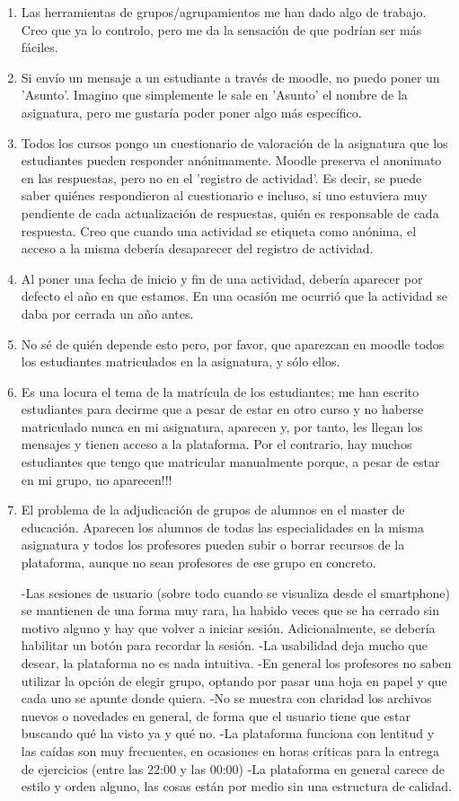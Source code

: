 \begin{enumerate}
\item Las herramientas de grupos/agrupamientos me han dado algo de trabajo. Creo que ya lo controlo, pero me da la sensación de que podrían ser más fáciles.
\item Si envío un mensaje a un estudiante a través de moodle, no puedo poner un 'Asunto'. Imagino que simplemente le sale en 'Asunto' el nombre de la asignatura, pero me gustaría poder poner algo más específico.
\item Todos los cursos pongo un cuestionario de valoración de la asignatura que los estudiantes pueden responder anónimamente. Moodle preserva el anonimato en las respuestas, pero no en el 'registro de actividad'. Es decir, se puede saber quiénes respondieron al cuestionario e incluso, si uno estuviera muy pendiente de cada actualización de respuestas, quién es responsable de cada respuesta. Creo que cuando una actividad se etiqueta como anónima, el acceso a la misma debería desaparecer del registro de actividad.
\item Al poner una fecha de inicio y fin de una actividad, debería aparecer por defecto el año en que estamos. En una ocasión me ocurrió que la actividad se daba por cerrada un año antes.
\item No sé de quién depende esto pero, por favor, que aparezcan en moodle todos los estudiantes matriculados en la asignatura, y sólo ellos.

\item Es una locura el tema de la matrícula de los estudiantes; me han escrito estudiantes para decirme que a pesar de estar en otro curso y no haberse matriculado nunca en mi asignatura, aparecen y, por tanto, les llegan los mensajes y tienen acceso a la plataforma. Por el contrario, hay muchos estudiantes que tengo que matricular manualmente porque, a pesar de estar en mi grupo, no aparecen!!! 

\item El problema de la adjudicación de grupos de alumnos en el master de educación. Aparecen los alumnos de todas las especialidades en la misma asignatura y todos los profesores pueden subir o borrar recursos de la plataforma, aunque no sean profesores de ese grupo en concreto.



-Las sesiones de usuario (sobre todo cuando se visualiza desde el smartphone) se mantienen de una forma muy rara, ha habido veces que se ha cerrado sin motivo alguno y hay que volver a iniciar sesión. Adicionalmente, se debería habilitar un botón para recordar la sesión.
-La usabilidad deja mucho que desear, la plataforma no es nada intuitiva.
-En general los profesores no saben utilizar la opción de elegir grupo, optando por pasar una hoja en papel y que cada uno se apunte donde quiera.
-No se muestra con claridad los archivos nuevos o novedades en general, de forma que el usuario tiene que estar buscando qué ha visto ya y qué no.
-La plataforma funciona con lentitud y las caídas son muy frecuentes, en ocasiones en horas críticas para la entrega de ejercicios (entre las 22:00 y las 00:00)
-La plataforma en general carece de estilo y orden alguno, las cosas están por medio sin una estructura de calidad.


\end{enumerate}
